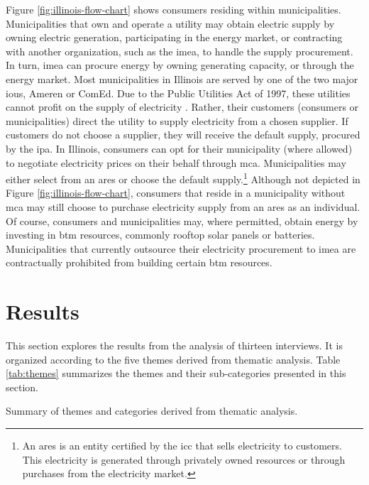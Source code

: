 Figure \ref{fig:illinois-flow-chart} shows consumers residing within
municipalities. Municipalities that own and operate a utility may obtain
electric supply by owning electric generation, participating in the energy
market, or contracting with another organization, such as the \ac{imea}, to
handle the supply procurement. In turn, \ac{imea} can procure energy by owning
generating capacity, or through the energy market. Most municipalities in
Illinois are served by one of the two major \acp{iou}, Ameren or ComEd. Due to
the Public Utilities Act of 1997, these utilities cannot profit on the supply of
electricity \cite{illinois_90th_general_assembly_electric_1997}. Rather, their
customers (consumers or municipalities) direct the utility to supply electricity
from a chosen supplier. If customers do not choose a supplier, they will receive
the default supply, procured by the \ac{ipa}. In Illinois, consumers can opt for
their municipality (where allowed) to negotiate electricity prices on their
behalf through \ac{mca}. Municipalities may either select from an \ac{ares} or
choose the default supply.\footnote{An \ac{ares} is an entity certified by the
\ac{icc} that sells electricity to customers. This electricity is generated
through privately owned resources or through purchases from the electricity
market.} Although not depicted in Figure \ref{fig:illinois-flow-chart},
consumers that reside in a municipality without \ac{mca} may still choose to
purchase electricity supply from an \ac{ares} as an individual. Of course,
consumers and municipalities may, where permitted, obtain energy by investing in
\ac{btm} resources, commonly rooftop solar panels or batteries. Municipalities
that currently outsource their electricity procurement to \ac{imea} are
contractually prohibited from building certain \ac{btm} resources.

\section{Results}
This section explores the results from the analysis of thirteen interviews. It
is organized according to the five themes derived from thematic analysis. Table
\ref{tab:themes} summarizes the themes and their sub-categories presented in
this section.

\begin{table}[ht!]
    \centering
    \caption{Summary of themes and categories derived from thematic analysis.}
    \label{tab:themes}
    
\end{table}

